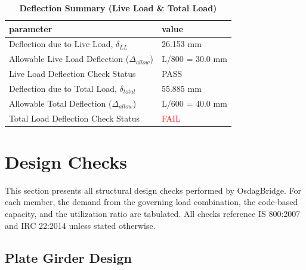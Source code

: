 \documentclass[12pt,a4paper]{report}
\numberwithin{table}{chapter}
\numberwithin{figure}{chapter}
\begin{document}
\vspace{1em}
\begin{longtable}{|L{7cm}|p{8.5cm}|}
\caption{\textbf{Deflection Summary (Live Load \& Total Load)}}
\hline
\textbf{parameter} & \textbf{value} \\
\hline
\textnormal{Deflection due to Live Load, $\delta_{LL}$} & 26.153 mm \\[6pt]
\hline
\textnormal{Allowable Live Load Deflection ($\Delta_{allow}$)} & L/800 = 30.0 mm \\[6pt]
\hline
\textnormal{Live Load Deflection Check Status} & PASS \\[6pt]
\hline
\textnormal{Deflection due to Total Load, $\delta_{total}$} & 55.885 mm \\[6pt]
\hline
\textnormal{Allowable Total Deflection ($\Delta_{allow}$)} & L/600 = 40.0 mm \\[6pt]
\hline
\textnormal{Total Load Deflection Check Status} & \textcolor{red}{FAIL} \\[6pt]
\hline
\end{longtable}

\vspace{1em}
\noindent
\noindent{}
\noindent{}
\noindent{}


\chapter{Design Checks}

This section presents all structural design checks performed by OsdagBridge. For each member, the demand from the governing load combination, the code-based capacity, and the utilization ratio are tabulated. All checks reference IS 800:2007 and IRC 22:2014 unless stated otherwise.

\section{Plate Girder Design}
\label{sec:plate-girder}
\end{document}
